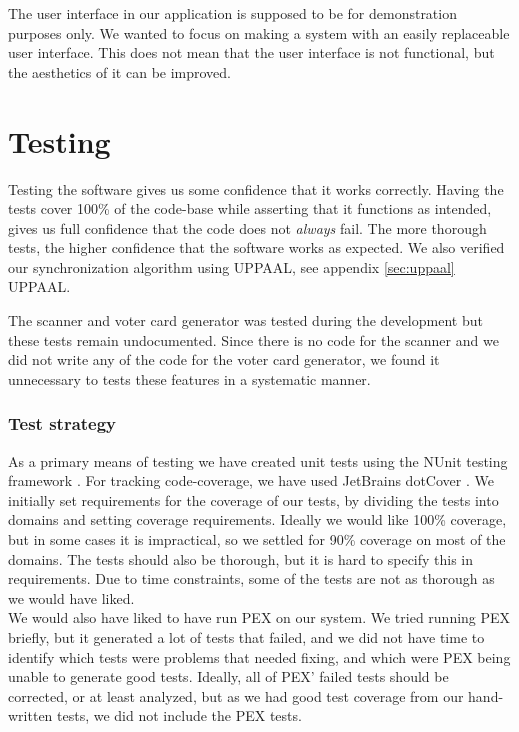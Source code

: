 \documentclass[a4paper]{report}
\begin{document}
The user interface in our application is supposed to be for demonstration purposes only. We wanted to focus on making a system with an easily replaceable user interface. This does not mean that the user interface is not functional, but the aesthetics of it can be improved.

\chapter{Testing}
Testing the software gives us some confidence that it works correctly. Having the tests cover 100\% of the code-base while asserting that it functions as intended, gives us full confidence that the code does not \emph{always} fail. The more thorough tests, the higher confidence that the software works as expected. We also verified our synchronization algorithm using UPPAAL, see appendix \ref{sec:uppaal} UPPAAL.

The scanner and voter card generator was tested during the development but these tests remain undocumented. Since there is no code for the scanner and we did not write any of the code for the voter card generator, we found it unnecessary to tests these features in a systematic manner. 

\subsection{Test strategy}
As a primary means of testing we have created unit tests using the NUnit testing framework \cite{nunit}.
For tracking code-coverage, we have used JetBrains dotCover \cite{dotcover}.
We initially set requirements for the coverage of our tests, by dividing the tests into domains and setting coverage requirements. Ideally we would like 100\% coverage, but in some cases it is impractical, so we settled for 90\% coverage on most of the domains. The tests should also be thorough, but it is hard to specify this in requirements. Due to time constraints, some of the tests are not as thorough as we would have liked. \\

We would also have liked to have run PEX \cite{pex} on our system. We tried running PEX briefly, but it generated a lot of tests that failed, and we did not have time to identify which tests were problems that needed fixing, and which were PEX being unable to generate good tests. Ideally, all of PEX' failed tests should be corrected, or at least analyzed, but as we had good test coverage from our hand-written tests, we did not include the PEX tests. \\
\end{document}

